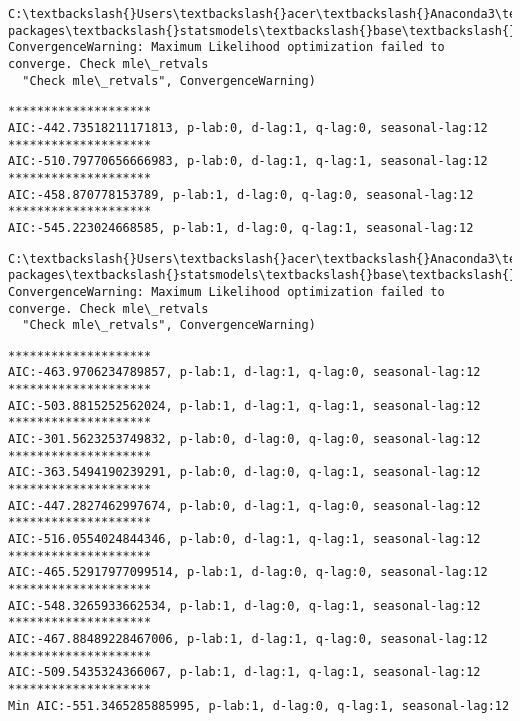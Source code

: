 \documentclass[11pt]{article}
\begin{document}
    \begin{Verbatim}[commandchars=\\\{\}]
C:\textbackslash{}Users\textbackslash{}acer\textbackslash{}Anaconda3\textbackslash{}lib\textbackslash{}site-packages\textbackslash{}statsmodels\textbackslash{}base\textbackslash{}model.py:508: ConvergenceWarning: Maximum Likelihood optimization failed to converge. Check mle\_retvals
  "Check mle\_retvals", ConvergenceWarning)

    \end{Verbatim}

    \begin{Verbatim}[commandchars=\\\{\}]
********************
AIC:-442.73518211171813, p-lab:0, d-lag:1, q-lag:0, seasonal-lag:12
********************
AIC:-510.79770656666983, p-lab:0, d-lag:1, q-lag:1, seasonal-lag:12
********************
AIC:-458.870778153789, p-lab:1, d-lag:0, q-lag:0, seasonal-lag:12
********************
AIC:-545.223024668585, p-lab:1, d-lag:0, q-lag:1, seasonal-lag:12

    \end{Verbatim}

    \begin{Verbatim}[commandchars=\\\{\}]
C:\textbackslash{}Users\textbackslash{}acer\textbackslash{}Anaconda3\textbackslash{}lib\textbackslash{}site-packages\textbackslash{}statsmodels\textbackslash{}base\textbackslash{}model.py:508: ConvergenceWarning: Maximum Likelihood optimization failed to converge. Check mle\_retvals
  "Check mle\_retvals", ConvergenceWarning)

    \end{Verbatim}

    \begin{Verbatim}[commandchars=\\\{\}]
********************
AIC:-463.9706234789857, p-lab:1, d-lag:1, q-lag:0, seasonal-lag:12
********************
AIC:-503.8815252562024, p-lab:1, d-lag:1, q-lag:1, seasonal-lag:12
********************
AIC:-301.5623253749832, p-lab:0, d-lag:0, q-lag:0, seasonal-lag:12
********************
AIC:-363.5494190239291, p-lab:0, d-lag:0, q-lag:1, seasonal-lag:12
********************
AIC:-447.2827462997674, p-lab:0, d-lag:1, q-lag:0, seasonal-lag:12
********************
AIC:-516.0554024844346, p-lab:0, d-lag:1, q-lag:1, seasonal-lag:12
********************
AIC:-465.52917977099514, p-lab:1, d-lag:0, q-lag:0, seasonal-lag:12
********************
AIC:-548.3265933662534, p-lab:1, d-lag:0, q-lag:1, seasonal-lag:12
********************
AIC:-467.88489228467006, p-lab:1, d-lag:1, q-lag:0, seasonal-lag:12
********************
AIC:-509.5435324366067, p-lab:1, d-lag:1, q-lag:1, seasonal-lag:12
********************
Min AIC:-551.3465285885995, p-lab:1, d-lag:0, q-lag:1, seasonal-lag:12

    \end{Verbatim}
\end{document}
